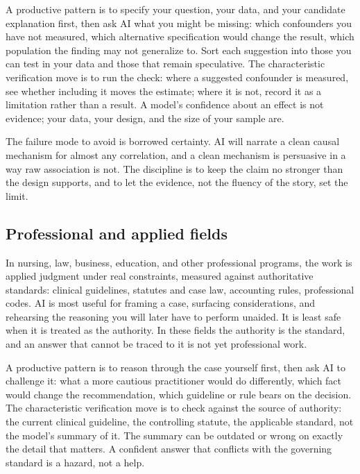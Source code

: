 \documentclass{SIAMbook2023}
\begin{document}
A productive pattern is to specify your question, your data, and your candidate explanation first, then ask AI what you might be missing: which confounders you have not measured, which alternative specification would change the result, which population the finding may not generalize to. Sort each suggestion into those you can test in your data and those that remain speculative. The characteristic verification move is to run the check: where a suggested confounder is measured, see whether including it moves the estimate; where it is not, record it as a limitation rather than a result. A model's confidence about an effect is not evidence; your data, your design, and the size of your sample are.

The failure mode to avoid is borrowed certainty. AI will narrate a clean causal mechanism for almost any correlation, and a clean mechanism is persuasive in a way raw association is not. The discipline is to keep the claim no stronger than the design supports, and to let the evidence, not the fluency of the story, set the limit.

\subsection{Professional and applied fields}
\label{subsec:professional-fields}

In nursing, law, business, education, and other professional programs, the work is applied judgment under real constraints, measured against authoritative standards: clinical guidelines, statutes and case law, accounting rules, professional codes. AI is most useful for framing a case, surfacing considerations, and rehearsing the reasoning you will later have to perform unaided. It is least safe when it is treated as the authority. In these fields the authority is the standard, and an answer that cannot be traced to it is not yet professional work.

A productive pattern is to reason through the case yourself first, then ask AI to challenge it: what a more cautious practitioner would do differently, which fact would change the recommendation, which guideline or rule bears on the decision. The characteristic verification move is to check against the source of authority: the current clinical guideline, the controlling statute, the applicable standard, not the model's summary of it. The summary can be outdated or wrong on exactly the detail that matters. A confident answer that conflicts with the governing standard is a hazard, not a help.
\end{document}
